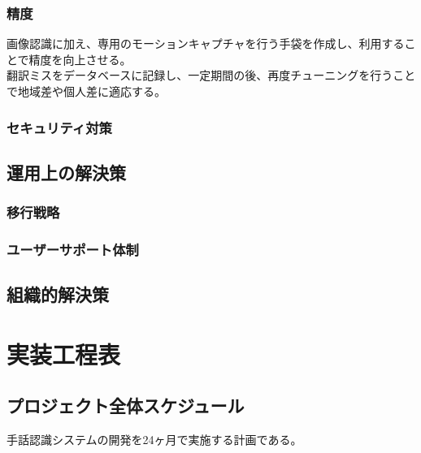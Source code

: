 \documentclass[12pt,a4paper]{jsarticle}
\begin{document}
\subsubsection{精度}
画像認識に加え、専用のモーションキャプチャを行う手袋を作成し、利用することで精度を向上させる。\\
翻訳ミスをデータベースに記録し、一定期間の後、再度チューニングを行うことで地域差や個人差に適応する。\\
\subsubsection{セキュリティ対策}

\subsection{運用上の解決策}

\subsubsection{移行戦略}

\subsubsection{ユーザーサポート体制}

\subsection{組織的解決策}

\section{実装工程表}

\subsection{プロジェクト全体スケジュール}
手話認識システムの開発を24ヶ月で実施する計画である。
\end{document}

